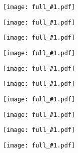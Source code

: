\documentclass{article}
\newcommand{\image}[1]{
\begin{figure}
\texttt{[image: full\_\#1.pdf]}
\end{figure}
}
\begin{document}
\image{000_title}
\image{010_he3}
\image{020_spwaves}
\image{030_HPD}
\image{040_exp}
\image{050_exp}
\image{060_res}
\image{070_the}
\image{080_num}
\image{999_black}
\end{document}

